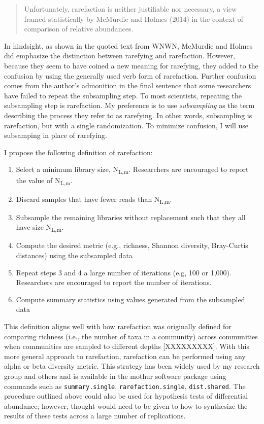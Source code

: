 \documentclass[
]{article}
\providecommand{\tightlist}{%
  \setlength{\itemsep}{0pt}\setlength{\parskip}{0pt}}
\begin{document}
\begin{quote}
Unfortunately, rarefaction is neither justifiable nor necessary, a view
framed statistically by McMurdie and Holmes (2014) in the context of
comparison of relative abundances.
\end{quote}

In hindsight, as shown in the quoted text from WNWN, McMurdie and Holmes
did emphasize the distinction between rarefying and rarefaction.
However, because they seem to have coined a new meaning for rarefying,
they added to the confusion by using the generally used verb form of
rarefaction. Further confusion comes from the author's admonition in the
final sentence that some researchers have failed to repeat the
subsampling step. To most scientists, repeating the subsampling step is
rarefaction. My preference is to use \emph{subsampling} as the term
describing the process they refer to as rarefying. In other words,
subsampling is rarefaction, but with a single randomization. To minimize
confusion, I will use subsamping in place of rarefying.

I propose the following definition of rarefaction:

\begin{enumerate}
\def\labelenumi{\arabic{enumi}.}
\tightlist
\item
  Select a minimum library size, N\textsubscript{L,m}. Researchers are
  encouraged to report the value of N\textsubscript{L,m}.
\item
  Discard samples that have fewer reads than N\textsubscript{L,m}.
\item
  Subsample the remaining libraries without replacement such that they
  all have size N\textsubscript{L,m}.
\item
  Compute the desired metric (e.g., richness, Shannon diversity,
  Bray-Curtis distances) using the subsampled data
\item
  Repeat steps 3 and 4 a large number of iterations (e.g, 100 or 1,000).
  Researchers are encouraged to report the number of iterations.
\item
  Compute summary statistics using values generated from the subsampled
  data
\end{enumerate}

This definition aligns well with how rarefaction was originally defined
for comparing richness (i.e., the number of taxa in a community) across
communities when communities are sampled to different depths
{[}XXXXXXXXX{]}. With this more general approach to rarefaction,
rarefaction can be performed using any alpha or beta diversity metric.
This strategy has been widely used by my research group and others and
is available in the mothur software package using commands such as
\texttt{summary.single}, \texttt{rarefaction.single},
\texttt{dist.shared}. The procedure outlined above could also be used
for hypothesis tests of differential abundance; however, thought would
need to be given to how to synthesize the results of these tests across
a large number of replications.
\end{document}
